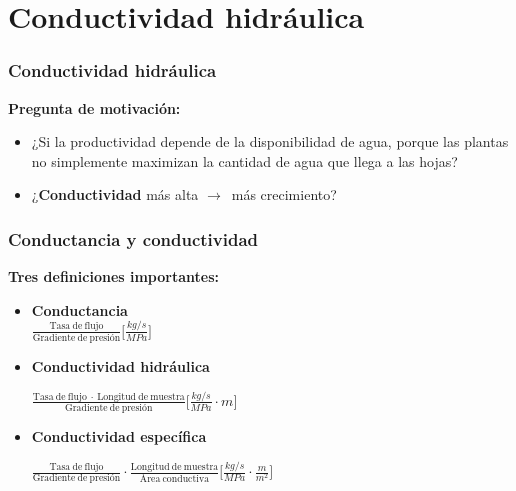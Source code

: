 \documentclass[usepdftitle=false]{beamer}
\newcommand{\Blue}[1]{{\color{blue!50!black}\textbf{#1}}}
\newcommand{\rar}{$\rightarrow$}
\begin{document}
\section{Conductividad hidráulica}

\begin{frame}
	\frametitle{Conductividad hidráulica}
	\begin{block}{\textbf{Pregunta de motivación:}}
      	\begin{itemize}
			\item<+-| alert@+> ¿Si la productividad depende de la disponibilidad de agua, porque las plantas no simplemente maximizan la cantidad de agua que llega a las hojas?
			\item<+-| alert@+>  ¿\textbf{Conductividad} más alta \rar\ más crecimiento?
		\end{itemize}
    \end{block}
\end{frame}



\begin{frame}
	\frametitle{Conductancia y conductividad}
\textbf{\Large Tres definiciones importantes:}
		\begin{itemize}
			\item \Blue{Conductancia} \\
			
		    \vspace{0.3em}			
			{\Large $\frac{\mathrm{Tasa\ de\ flujo}}{\mathrm{Gradiente\ de\ presión}} \Big[\frac{kg/s}{MPa}\Big]$}
			
		    \vspace{0.5em}
			\item \Blue{Conductividad hidráulica} 			
			
			\vspace{0.3em}	
			{\Large$\frac{\mathrm{Tasa\ de\ flujo\ \cdot\ Longitud\ de\ muestra}}{\mathrm{Gradiente\ de\ presión}} 			\Big[\frac{kg/s}{MPa} \cdot m\Big]$}
			
					    \vspace{0.5em}
			\item \Blue{Conductividad específica}			
			
			\vspace{0.3em}	
			{\Large $\frac{\mathrm{Tasa\ de\ flujo}}{\mathrm{Gradiente\ de\ presión}} \cdot \frac{\mathrm{Longitud\ de\ muestra}}{\mathrm{Área\ conductiva}}\Big[\frac{kg/s}{MPa} \cdot \frac{m}{m^2}\Big]$}
		\end{itemize}

\end{frame}
\end{document}
